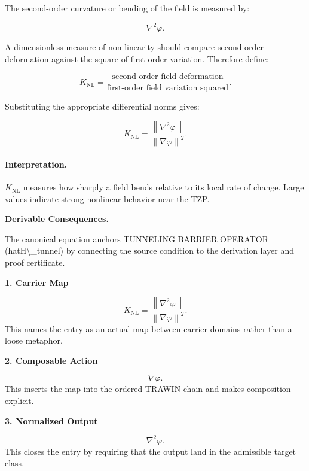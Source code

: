The second-order curvature or bending of the field is measured by:

\begin{equation}
\nabla^2\varphi .
\end{equation}

A dimensionless measure of non-linearity should compare second-order deformation against the square of first-order variation. Therefore define:

\begin{equation}
K_{\mathrm{NL}}
=
\frac{\text{second-order field deformation}}
{\text{first-order field variation squared}} .
\end{equation}

Substituting the appropriate differential norms gives:

\begin{equation}
\boxed{
K_{\mathrm{NL}}
=
\frac{\left\lVert \nabla^{2}\varphi\right\rVert}
{\left\lVert \nabla\varphi\right\rVert^{2}} .
}
\end{equation}

\paragraph{Interpretation.}
$K_{\mathrm{NL}}$ measures how sharply a field bends relative to its local rate of change. Large values indicate strong nonlinear behavior near the TZP.

\par\vspace{0.35em}
\noindent\textbf{Derivable Consequences.}\quad
\begingroup
\footnotesize
\raggedright
The canonical equation anchors TUNNELING BARRIER OPERATOR (hatH\textbackslash{}\_tunnel) by connecting the source condition to the derivation layer and proof certificate.
\par\endgroup

\noindent\textbf{1. Carrier Map}\par
\[
K_{\mathrm{NL}} = \frac{\left\lVert \nabla^{2}\varphi\right\rVert} {\left\lVert \nabla\varphi\right\rVert^{2}}.
\]
\noindent This names the entry as an actual map between carrier domains rather than a loose metaphor.\par
\noindent\textbf{2. Composable Action}\par
\[
\nabla\varphi.
\]
\noindent This inserts the map into the ordered TRAWIN chain and makes composition explicit.\par
\noindent\textbf{3. Normalized Output}\par
\[
\nabla^2\varphi.
\]
\noindent This closes the entry by requiring that the output land in the admissible target class.\par

